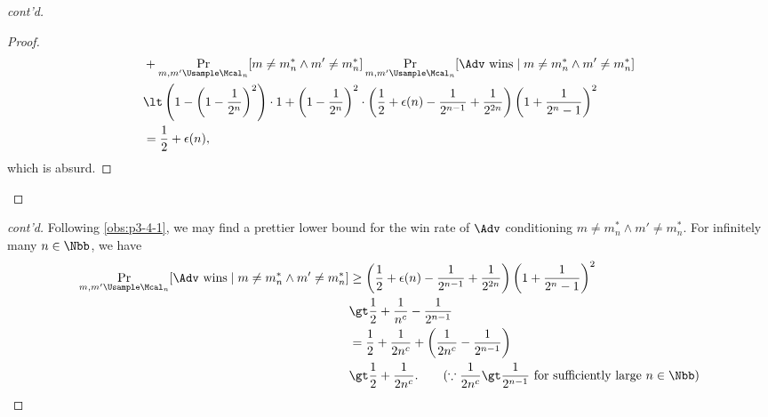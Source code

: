\begin{answer}[iv]
\begin{proof}[cont'd]
\begin{proof}
\begin{align*}
                &+ \Pr_{m,m'\Usample\Mcal_n}[m\neq m^\ast_n\land m'\neq m^\ast_n]\Pr_{m,m'\Usample\Mcal_n}[\Adv \textrm{ wins}\mid m\neq m^\ast_n\land m'\neq m^\ast_n]\\
                &\lt \left(1-\left(1-\frac{1}{2^n}\right)^2\right)\cdot 1+\left(1-\frac{1}{2^n}\right)^2 \cdot \left(\frac{1}{2}+\epsilon(n)-\frac{1}{2^{n-1}}+\frac{1}{2^{2n}}\right)\left(1+\frac{1}{2^n -1}\right)^2\\
                &= \frac{1}{2}+\epsilon(n),
            \end{align*}
            which is absurd.
        \end{proof}
        \end{proof}\begin{proof}[cont'd]

        Following \autoref{obs:p3-4-1}, we may find a prettier lower bound for the win rate of $\Adv$ conditioning $m\neq m^\ast_n\land m'\neq m^\ast_n$. For infinitely many $n\in\Nbb$, we have
        \begin{align}\label{eq:p3-4-3}
            \Pr_{m,m'\Usample\Mcal_n}[\Adv \textrm{ wins}\mid m\neq m^\ast_n\land m'\neq m^\ast_n]
            &\ge \left(\frac{1}{2}+\epsilon(n)-\frac{1}{2^{n-1}}+\frac{1}{2^{2n}}\right)\left(1+\frac{1}{2^n -1}\right) ^2 \notag\\
            &\gt \frac{1}{2}+\frac{1}{n^c} -\frac{1}{2^{n-1}}\notag\\
            &= \frac{1}{2}+\frac{1}{2n^c}+\left(\frac{1}{2n^c} -\frac{1}{2^{n-1}}\right)\notag\\
            &\gt \frac{1}{2}+\frac{1}{2n^c}. \qquad (\because \frac{1}{2n^c} \gt \frac{1}{2^{n-1}} \textrm{ for sufficiently large } n\in\Nbb)
        \end{align}
        

\end{proof}
\end{answer}

